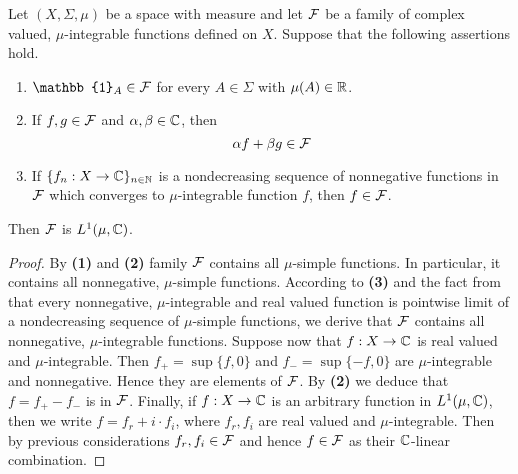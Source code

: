 \begin{proposition}\label{proposition:measurable_induction_for_complex}
    Let $(X,\Sigma,\mu)$ be a space with measure and let ${\mathcal F}$ be a family of complex valued, $\mu$-integrable functions defined on $X$. Suppose that the following assertions hold.
    \begin{enumerate}[label=\emph{\textbf{(\arabic*)}}, leftmargin=*]
        \item $\mathbb{1}_A\in \cF$ for every $A\in \Sigma$ with $\mu(A)\in {\mathbb R}$.
        \item If $f, g\in {\mathcal F}$ and $\alpha, \beta\in {\mathbb C}$, then
              $$\alpha f + \beta g\in {\mathcal F}$$
        \item If $\{f_n:X\rightarrow {\mathbb C}\}_{n\in {\mathbb N}}$ is a nondecreasing sequence of nonnegative functions in ${\mathcal F}$ which converges to $\mu$-integrable function $f$, then $f\in {\mathcal F}$.
    \end{enumerate}
    Then ${\mathcal F}$ is $L^1(\mu, {\mathbb C})$.
\end{proposition}
\begin{proof}
    By \textbf{(1)} and \textbf{(2)} family ${\mathcal F}$ contains all $\mu$-simple functions. In particular, it contains all nonnegative, $\mu$-simple functions. According to \textbf{(3)} and the fact from \cite{Integration} that every nonnegative, $\mu$-integrable and real valued function is pointwise limit of a nondecreasing sequence of $\mu$-simple functions, we derive that ${\mathcal F}$ contains all nonnegative, $\mu$-integrable functions. Suppose now that $f:X\rightarrow {\mathbb C}$ is real valued and $\mu$-integrable. Then $f_+ = \sup \{f, 0\}$ and $f_- = \sup\{-f, 0\}$ are $\mu$-integrable and nonnegative. Hence they are elements of ${\mathcal F}$. By \textbf{(2)} we deduce that $f = f_+ - f_-$ is in ${\mathcal F}$. Finally, if $f:X\rightarrow {\mathbb C}$ is an arbitrary function in $L^1(\mu, {\mathbb C})$, then we write $f = f_r + i\cdot f_i$, where $f_r, f_i$ are real valued and $\mu$-integrable. Then by previous considerations $f_r,f_i\in {\mathcal F}$ and hence $f\in {\mathcal F}$ as their ${\mathbb C}$-linear combination.
\end{proof}

